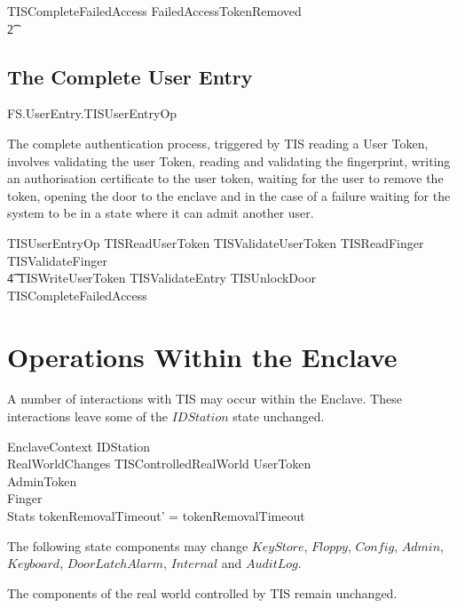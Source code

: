 \begin{zed}
        TISCompleteFailedAccess  FailedAccessTokenRemoved 
\\      \t2     \lor [ WaitingTokenRemoval | status = waitingRemoveTokenFail ] 
\end{zed}

\section{The Complete User Entry}

\begin{traceunit}{FS.UserEntry.TISUserEntryOp}
\end{traceunit}

The complete authentication process, triggered by TIS reading a User
Token, involves validating the user Token, reading and validating the
fingerprint, 
writing an authorisation certificate to the user token, waiting for
the user to remove the token, opening the door to the enclave and
in the case of a failure waiting for the system to
be in a state where it can admit another user.

\begin{zed}
        TISUserEntryOp  TISReadUserToken \lor TISValidateUserToken \lor TISReadFinger \lor
                TISValidateFinger 
\\ \t4          \lor TISWriteUserToken \lor  TISValidateEntry \lor TISUnlockDoor \lor
                TISCompleteFailedAccess 
\end{zed}



\chapter{Operations Within the Enclave}
\label{sec:Enclave}

A number of interactions with TIS may occur within the
Enclave.
These interactions leave some of the $IDStation$ state unchanged.

\begin{schema}{EnclaveContext}
        \Delta IDStation
\\      RealWorldChanges
\also
        \Xi TISControlledRealWorld
\also
        \Xi UserToken
\\      \Xi AdminToken
\\      \Xi Finger
\\      \Xi Stats
\where
        tokenRemovalTimeout' = tokenRemovalTimeout
\end{schema}
\begin{Zcomment}
\item
The following state components may change $KeyStore$, 
$Floppy$, $Config$, $Admin$, $Keyboard$,
$DoorLatchAlarm$, $Internal$ and $AuditLog$. 
\item
The components of the real world controlled by TIS remain unchanged.
\end{Zcomment}

